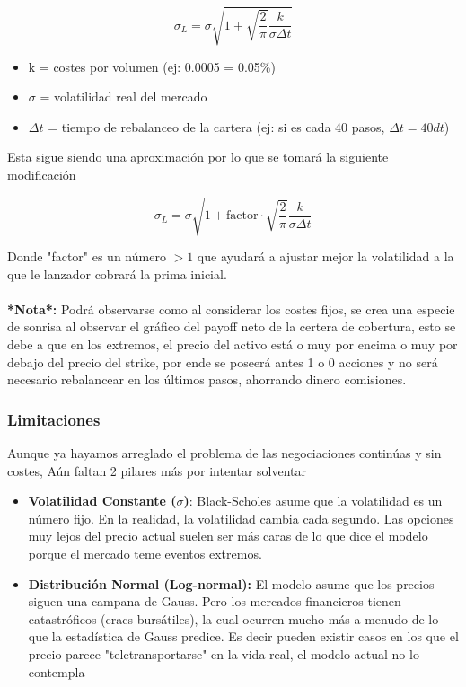 \documentclass[11pt]{article}
\newcommand{\comillas}[1]{"#1"} %
\newcommand{\mult}[0]{\!\cdot\!} %
\begin{document}
				\begin{equation}
					\sigma_L = \sigma \sqrt{1 + \sqrt{\frac{2}{\pi}} \frac{k}{\sigma\Delta t}}
				\end{equation}
				
				\begin{itemize}
					\item k = costes por volumen (ej: 0.0005 = 0.05\%)
					\item $\sigma$ = volatilidad real del mercado
					\item $\Delta t$ = tiempo de rebalanceo de la cartera (ej: si es cada 40 pasos, $\Delta t = 40dt$)
				\end{itemize}
				
				Esta sigue siendo una aproximación por lo que se tomará la siguiente modificación
				
				\begin{equation}
					\sigma_L = \sigma \sqrt{1 + \text{factor} \mult \sqrt{\frac{2}{\pi}} \frac{k}{\sigma\Delta t}}
				\end{equation}
				
				Donde \comillas{factor} es un número $> 1$ que ayudará a ajustar mejor la volatilidad a la que le lanzador cobrará la prima inicial.\\
				\\
				\textbf{*Nota*:} Podrá observarse como al considerar los costes fijos, se crea una especie de sonrisa al observar el gráfico del payoff neto de la certera de cobertura, esto se debe a que en los extremos, el precio del activo está o muy por encima o muy por debajo del precio del strike, por ende se poseerá antes 1 o 0 acciones y no será necesario rebalancear en los últimos pasos, ahorrando dinero comisiones.
				
				\subsubsection{Limitaciones}
				Aunque ya hayamos arreglado el problema de las negociaciones continúas y sin costes, Aún faltan 2 pilares más por intentar solventar
				
				\begin{itemize}
					\item \textbf{Volatilidad Constante ($\sigma$)}: Black-Scholes asume que la volatilidad es un número fijo. En la realidad, la volatilidad cambia cada segundo. Las opciones muy lejos del precio actual suelen ser más caras de lo que dice el modelo porque el mercado teme eventos extremos.
					
					\item \textbf{Distribución Normal (Log-normal):} El modelo asume que los precios siguen una campana de Gauss. Pero los mercados financieros tienen catastróficos (cracs bursátiles), la cual ocurren mucho más a menudo de lo que la estadística de Gauss predice. Es decir pueden existir casos en los que el precio parece \comillas{teletransportarse} en la vida real, el modelo actual no lo contempla\\
				\end{itemize}
				
\end{document}
